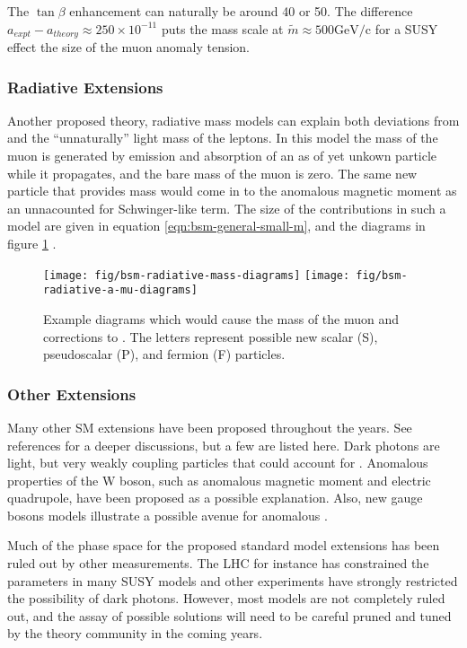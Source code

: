 The $\tan{\beta}$ enhancement can naturally be around 40 or 50.  The difference $a_{expt} - a_{theory} \approx 250 \times 10^{-11}$ puts the mass scale at $\tilde{m} \approx 500 \mathrm{GeV/c}$ for a SUSY effect the size of the muon anomaly tension.

\subsubsection{Radiative Extensions}
Another proposed theory, radiative mass models can explain both deviations from \gmtwo and the ``unnaturally'' light mass of the leptons.  In this model the mass of the muon is generated by emission and absorption of an as of yet unkown particle while it propagates, and the bare mass of the muon is zero.  The same new particle that provides mass would come in to the anomalous magnetic moment as an unnacounted for Schwinger-like term.  The size of the contributions in such a model are given in equation \ref{eqn:bsm-general-small-m}, and the diagrams in figure \ref{fig:bsm-radiative-diagrams} \cite{a-mu-harbinger}.

\begin{figure}
\label{fig:bsm-radiative-diagrams}
\centering
\texttt{[image: fig/bsm-radiative-mass-diagrams]}
\texttt{[image: fig/bsm-radiative-a-mu-diagrams]}
\caption{Example diagrams which would cause the mass of the muon and corrections to \mugmtwo.  The letters represent possible new scalar (S), pseudoscalar (P), and fermion (F) particles.}
\end{figure}

\subsubsection{Other Extensions}

Many other SM extensions have been proposed throughout the years.  See references \cite{a-mu-harbinger, the-muon-g-2, e989-tdr} for a deeper discussions, but a few are listed here.  Dark photons are light, but very weakly coupling particles that could account for \mugmtwo.  Anomalous properties of the W boson, such as anomalous magnetic moment and electric quadrupole, have been proposed as a possible explanation.  Also, new gauge bosons models illustrate a possible avenue for anomalous \gmtwo.

Much of the phase space for the proposed standard model extensions has been ruled out by other measurements.  The LHC for instance has constrained the parameters in many SUSY models and other experiments have strongly restricted the possibility of dark photons.  However, most models are not completely ruled out, and the assay of possible solutions will need to be careful pruned and tuned by the theory community in the coming years.


